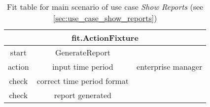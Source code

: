 
\begin{table}
\begin{centering}
\begin{tabular}{|c|c|c|}

\hline  \multicolumn{3}{|c|}{fit.ActionFixture} \\
\hline start & GenerateReport &  \\ 
\hline action & input time period & enterprise manager \\ 
\hline check & correct time period format &  \\ 
\hline check & report generated &  \\ 
\hline 
\end{tabular}

\caption{Fit table for main scenario of use case \emph{Show Reports} (see \autoref{sec:use_case_show_reports})}
 
\par\end{centering}
\end{table}